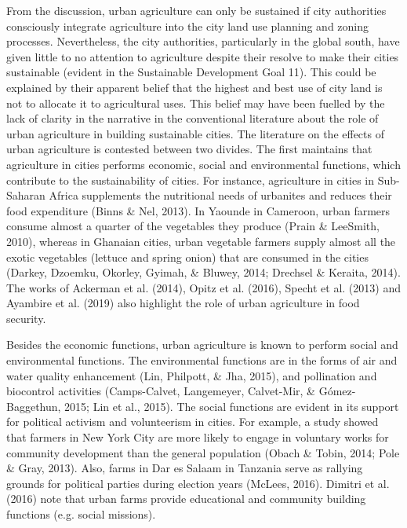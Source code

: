 From the discussion, urban agriculture can only be sustained if city authorities consciously integrate agriculture into the city land use planning and zoning processes. Nevertheless, the city authorities, particularly in the global south, have given little to no attention to agriculture despite their resolve to make their cities sustainable (evident in the Sustainable Development Goal 11). This could be explained by their apparent belief that the highest and best use of city land is not to allocate it to agricultural uses. This belief may have been fuelled by the lack of clarity in the narrative in the conventional literature about the role of urban agriculture in building sustainable cities. The literature on the effects of urban agriculture is contested between two divides. The first maintains that agriculture in cities performs economic, social and environmental functions, which contribute to the sustainability of cities. For instance, agriculture in cities in Sub-Saharan Africa supplements the nutritional needs of urbanites and reduces their food expenditure (Binns \& Nel, 2013). In Yaounde in Cameroon, urban farmers consume almost a quarter of the vegetables they produce (Prain \& LeeSmith, 2010), whereas in Ghanaian cities, urban vegetable farmers supply almost all the exotic vegetables (lettuce and spring onion) that are consumed in the cities (Darkey, Dzoemku, Okorley, Gyimah, \& Bluwey, 2014; Drechsel \& Keraita, 2014). The works of Ackerman et al. (2014), Opitz et al. (2016), Specht et al. (2013) and Ayambire et al. (2019) also highlight the role of urban agriculture in food security.

Besides the economic functions, urban agriculture is known to perform social and environmental functions. The environmental functions are in the forms of air and water quality enhancement (Lin, Philpott, \& Jha, 2015), and pollination and biocontrol activities (Camps-Calvet, Langemeyer, Calvet-Mir, \& Gómez-Baggethun, 2015; Lin et al., 2015). The social functions are evident in its support for political activism and volunteerism in cities. For example, a study showed that farmers in New York City are more likely to engage in voluntary works for community development than the general population (Obach \& Tobin, 2014; Pole \& Gray, 2013). Also, farms in Dar es Salaam in Tanzania serve as rallying grounds for political parties during election years (McLees, 2016). Dimitri et al. (2016) note that urban farms provide educational and community building functions (e.g. social missions).

